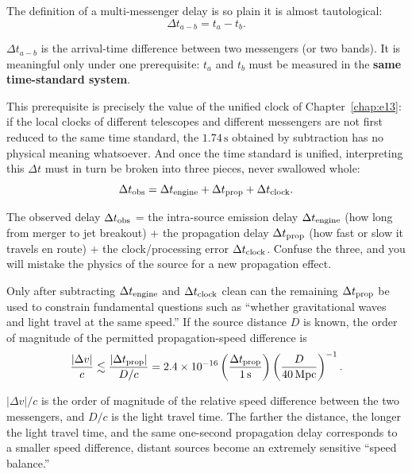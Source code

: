 The definition of a multi-messenger delay is so plain it is almost tautological:
\begin{equation}
  \Delta t_{a-b}=t_a-t_b .
  \label{eq:e20-mm-delay}
\end{equation}
\begin{formulaexplain}
\(\Delta t_{a-b}\) is the arrival-time difference between two messengers (or two bands). It is meaningful only under one prerequisite: \(t_a\) and \(t_b\) must be measured in the \textbf{same time-standard system}.
\end{formulaexplain}
This prerequisite is precisely the value of the unified clock of Chapter~\ref{chap:e13}: if the local clocks of different telescopes and different messengers are not first reduced to the same time standard, the \(1.74\,\mathrm{s}\) obtained by subtraction has no physical meaning whatsoever. And once the time standard is unified, interpreting this \(\Delta t\) must in turn be broken into three pieces, never swallowed whole:
\begin{equation}
  \Delta t_{\rm obs}
  =
  \Delta t_{\rm engine}
  +
  \Delta t_{\rm prop}
  +
  \Delta t_{\rm clock}.
  \label{eq:e20-delay-budget}
\end{equation}
\begin{formulaexplain}
The observed delay \(\Delta t_{\rm obs}\) = the intra-source emission delay \(\Delta t_{\rm engine}\) (how long from merger to jet breakout) + the propagation delay \(\Delta t_{\rm prop}\) (how fast or slow it travels en route) + the clock/processing error \(\Delta t_{\rm clock}\). Confuse the three, and you will mistake the physics of the source for a new propagation effect.
\end{formulaexplain}
Only after subtracting \(\Delta t_{\rm engine}\) and \(\Delta t_{\rm clock}\) clean can the remaining \(\Delta t_{\rm prop}\) be used to constrain fundamental questions such as ``whether gravitational waves and light travel at the same speed.'' If the source distance \(D\) is known, the order of magnitude of the permitted propagation-speed difference is
\begin{equation}
  \frac{|\Delta v|}{c}
  \lesssim
  \frac{|\Delta t_{\rm prop}|}{D/c}
  =
  2.4\times10^{-16}
  \left(\frac{\Delta t_{\rm prop}}{1\,{\rm s}}\right)
  \left(\frac{D}{40\,{\rm Mpc}}\right)^{-1}.
  \label{eq:e20-speed-difference}
\end{equation}
\begin{formulaexplain}
\(|\Delta v|/c\) is the order of magnitude of the relative speed difference between the two messengers, and \(D/c\) is the light travel time. The farther the distance, the longer the light travel time, and the same one-second propagation delay corresponds to a smaller speed difference, distant sources become an extremely sensitive ``speed balance.''
\end{formulaexplain}
